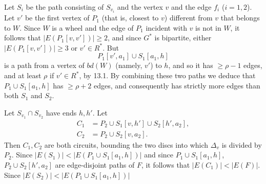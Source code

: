 Let $S_i$ be the path consisting of $S_{v_i}$ and the vertex $v$ and the edge $f_i$ ($i = 1, 2$). Let $v'$ be the first vertex of $P_1$ (that is, closest to $v$) different from $v$ that belongs to $W$. Since $W$ is a wheel and the edge of $P_1$ incident with $v$ is not in $W$, it follows that $|E(P_1[v, v'])| \ge 2$, and since $G^*$ is bipartite, either $|E(P_1[v, v'])| \ge 3$ or $v' \in R^*$. But
\begin{equation*}
P_1[v', a_1] \cup S_1[a_1, h]
\end{equation*}
is a path from a vertex of $bd(W)$ (namely, $v'$) to $h$, and so it has $\ge \rho - 1$ edges, and at least $\rho$ if $v' \in R^*$, by 13.1. By combining these two paths we deduce that $P_1 \cup S_1[a_1, h]$ has $\ge \rho + 2$ edges, and consequently has strictly more edges than both $S_1$ and $S_2$.

Let $S_{v_1} \cap S_{v_2}$ have ends $h, h'$. Let
\begin{align*}
C_1 &= P_2 \cup S_1[v, h'] \cup S_2[h', a_2], \\
C_2 &= P_2 \cup S_2[v, a_2].
\end{align*}
Then $C_1, C_2$ are both circuits, bounding the two discs into which $\Delta_v$ is divided by $P_2$. Since $|E(S_1)| < |E(P_1 \cup S_1[a_1, h])|$ and since $P_1 \cup S_1[a_1, h]$, $P_2 \cup S_2[h', a_2]$ are edge-disjoint paths of $F$, it follows that $|E(C_1)| < |E(F)|$. Since $|E(S_2)| < |E(P_1 \cup S_1[a_1, h])|$
